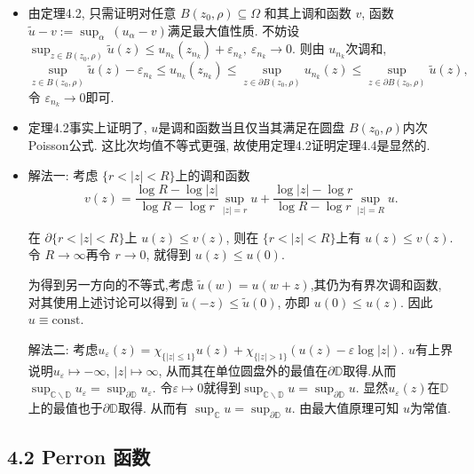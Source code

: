 \begin{itemize}
    \item[4.1.5]

由定理4.2, 只需证明对任意 $B(z_0,\rho) \subseteq \Omega$ 和其上调和函数 $v$, 
函数$\tilde{u}-v := \sup_\alpha\ (u_\alpha-v)$满足最大值性质.
不妨设 $\sup_{z\in B(z_0,\rho)} \tilde{u}(z) 
\le   u_{n_k}(z_{n_k})+\varepsilon_{n_k},\ \varepsilon_{n_k} \to 0$. 
则由 $u_{n_k}$次调和, $$\sup_{z\in B(z_0,\rho)} \tilde{u}(z)-\varepsilon_{n_k} 
\le u_{n_k}(z_{n_k})\le \sup_{z\in \partial B(z_0,\rho)} u_{n_k}(z)
\le  \sup_{z\in \partial B(z_0,\rho)} \tilde{u}(z),$$ 
令 $\varepsilon_{n_k}\to 0$即可.


    \item[4.1.6]

定理4.2事实上证明了, $u$是调和函数当且仅当其满足在圆盘 $B(z_0,\rho)$内次 Poisson公式. 
这比次均值不等式更强, 故使用定理4.2证明定理4.4是显然的.

    \item[4.1.7]

解法一: 考虑 $\{r<|z|<R\}$上的调和函数 
$$v(z) = \frac{\log R - \log |z|}{\log R - \log r} \sup_{|z|= r} u 
+ \frac{\log |z| - \log r}{\log R - \log r} \sup_{|z|= R} u.$$

在 $\partial \{r<|z|<R\}$上 $u(z) \le v(z)$, 则在 $\{r<|z|<R\}$上有 $u(z)\le v(z)$. 
令 $R\to \infty$再令 $r \to 0$, 就得到 $u(z)\le  u(0)$.

为得到另一方向的不等式,考虑 $\tilde{u}(w) = u(w+z)$,其仍为有界次调和函数, 
对其使用上述讨论可以得到 $\tilde{u}(-z)\le \tilde{u}(0)$, 亦即 $u(0)\le  u(z)$.
因此 $u \equiv  \text{const}$.


解法二: 考虑$u_{\varepsilon}(z) = \chi_{\{|z|\le 1\}}u(z)+  \chi_{\{|z|>1\}}(u(z)-\varepsilon\log|z|)$.
$u$有上界说明$u_{\varepsilon}\mapsto -\infty,\ |z|\mapsto \infty$,
从而其在单位圆盘外的最值在$\partial\mathbb{D}$取得.从而 $\sup_{\mathbb{C}\backslash\mathbb{D}}u_{\varepsilon} = \sup_{\partial\mathbb{D}}u_{\varepsilon} $. 
令$\varepsilon\mapsto 0$就得到$\sup_{\mathbb{C}\backslash\mathbb{D}}u = \sup_{\partial\mathbb{D}}u$. 显然$u_{\varepsilon}(z)$在$\mathbb{D}$上的最值也于$\partial\mathbb{D}$取得.
 从而有 $\sup_{\mathbb{C}}u = \sup_{\partial\mathbb{D}}u$. 由最大值原理可知 $u$为常值.
\end{itemize} 

\subsection*{4.2 Perron 函数}

